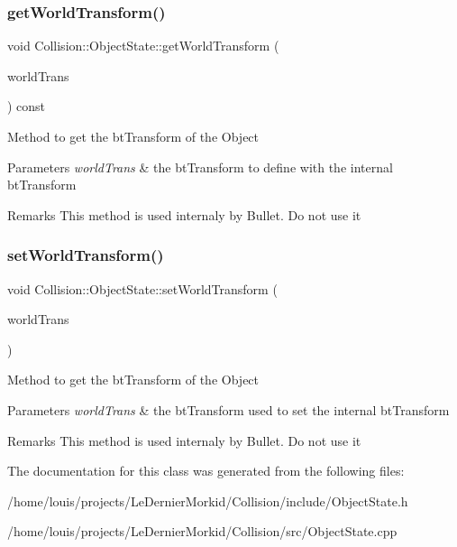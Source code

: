 \subsubsection{\texorpdfstring{get\+World\+Transform()}{getWorldTransform()}}
{\footnotesize\ttfamily void Collision\+::\+Object\+State\+::get\+World\+Transform (\begin{DoxyParamCaption}\item[{bt\+Transform \&}]{world\+Trans }\end{DoxyParamCaption}) const\hspace{0.3cm}{\ttfamily [virtual]}}

Method to get the bt\+Transform of the Object 
\begin{DoxyParams}{Parameters}
{\em world\+Trans} & the bt\+Transform to define with the internal bt\+Transform \\
\hline
\end{DoxyParams}
\begin{DoxyRemark}{Remarks}
This method is used internaly by Bullet. Do not use it 
\end{DoxyRemark}
\mbox{\label{class_collision_1_1_object_state_a7aeced5d3e1ae27eb7a31f2604ab227c}} 
\subsubsection{\texorpdfstring{set\+World\+Transform()}{setWorldTransform()}}
{\footnotesize\ttfamily void Collision\+::\+Object\+State\+::set\+World\+Transform (\begin{DoxyParamCaption}\item[{const bt\+Transform \&}]{world\+Trans }\end{DoxyParamCaption})\hspace{0.3cm}{\ttfamily [virtual]}}

Method to get the bt\+Transform of the Object 
\begin{DoxyParams}{Parameters}
{\em world\+Trans} & the bt\+Transform used to set the internal bt\+Transform \\
\hline
\end{DoxyParams}
\begin{DoxyRemark}{Remarks}
This method is used internaly by Bullet. Do not use it 
\end{DoxyRemark}


The documentation for this class was generated from the following files\+:\begin{DoxyCompactItemize}
\item 
/home/louis/projects/\+Le\+Dernier\+Morkid/\+Collision/include/Object\+State.\+h\item 
/home/louis/projects/\+Le\+Dernier\+Morkid/\+Collision/src/Object\+State.\+cpp\end{DoxyCompactItemize}
